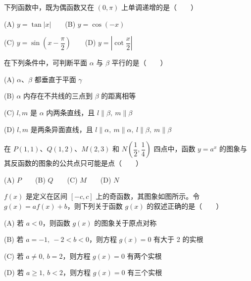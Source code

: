 \begin{question}
下列函数中，既为偶函数又在 \((0,\pi)\) 上单调递增的是\mbox{（　　）}

    (A) \(y=\tan|x|\)　　(B) \(y=\cos(-x)\)

    (C) \(y=\sin\left(x-\dfrac{\pi}{2}\right)\)　　(D) \(y=\left|\cot\dfrac{x}{2}\right|\)

\end{question}
\begin{question}
在下列条件中，可判断平面 \(\alpha\) 与 \(\beta\) 平行的是\mbox{（　　）}

    (A) \(\alpha\text{、}\beta\) 都垂直于平面 \(\gamma\)

    (B) \(\alpha\) 内存在不共线的三点到 \(\beta\) 的距离相等

    (C) \(l,m\) 是 \(\alpha\) 内两条直线，且 \(l\parallel\beta,\ m\parallel\beta\)

    (D) \(l,m\) 是两条异面直线，且 \(l\parallel\alpha,\ m\parallel\alpha,\ l\parallel\beta,\ m\parallel\beta\)

\end{question}
\begin{question}
在 \(P(1,1)\text{、}Q(1,2)\text{、}M(2,3)\) 和 \(N\left(\dfrac12,\dfrac14\right)\) 四点中，函数 \(y=a^x\) 的图象与其反函数的图象的公共点只可能是点\mbox{（　　）}

    (A) \(P\)　　(B) \(Q\)　　(C) \(M\)　　(D) \(N\)

\Needspace{0.4\textheight}
\end{question}
\begin{question}
\(f(x)\) 是定义在区间 \([-c,c]\) 上的奇函数，其图象如图所示。令 \(g(x)=af(x)+b\)，则下列关于函数 \(g(x)\) 的叙述正确的是\mbox{（　　）}

    (A) 若 \(a<0\)，则函数 \(g(x)\) 的图象关于原点对称

    (B) 若 \(a=-1,\ -2<b<0\)，则方程 \(g(x)=0\) 有大于 2 的实根

    (C) 若 \(a\ne0,\ b=2\)，则方程 \(g(x)=0\) 有两个实根

    (D) 若 \(a\ge1,\ b<2\)，则方程 \(g(x)=0\) 有三个实根
\nopagebreak[4]
\begin{center}\end{center}
\nopagebreak[4]
\end{question}

